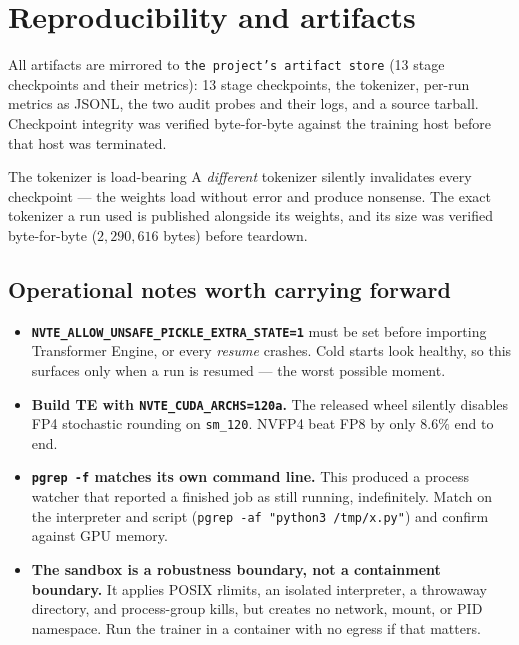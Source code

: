 \documentclass[10pt,a4paper]{article}
\newcommand{\code}[1]{\texttt{\small #1}}
\begin{document}
\section{Reproducibility and artifacts}

All artifacts are mirrored to \code{the project's artifact store}
(13 stage checkpoints and their metrics): 13 stage checkpoints, the tokenizer, per-run metrics as
JSONL, the two audit probes and their logs, and a source tarball. Checkpoint
integrity was verified byte-for-byte against the training host before that host
was terminated.

\begin{finding}{The tokenizer is load-bearing}
A \emph{different} tokenizer silently invalidates every checkpoint --- the
weights load without error and produce nonsense. The exact tokenizer a run used
is published alongside its weights, and its size was verified byte-for-byte
($2{,}290{,}616$ bytes) before teardown.
\end{finding}

\subsection{Operational notes worth carrying forward}

\begin{itemize}
\item \textbf{\code{NVTE\_ALLOW\_UNSAFE\_PICKLE\_EXTRA\_STATE=1}} must be set
before importing Transformer Engine, or every \emph{resume} crashes. Cold starts
look healthy, so this surfaces only when a run is resumed --- the worst possible
moment.
\item \textbf{Build TE with \code{NVTE\_CUDA\_ARCHS=120a}.} The released wheel
silently disables FP4 stochastic rounding on \code{sm\_120}. NVFP4 beat FP8 by
only $8.6\%$ end to end.
\item \textbf{\code{pgrep -f} matches its own command line.} This produced a
process watcher that reported a finished job as still running, indefinitely.
Match on the interpreter and script (\code{pgrep -af "python3 /tmp/x.py"}) and
confirm against GPU memory.
\item \textbf{The sandbox is a robustness boundary, not a containment
boundary.} It applies POSIX rlimits, an isolated interpreter, a throwaway
directory, and process-group kills, but creates no network, mount, or PID
namespace. Run the trainer in a container with no egress if that matters.
\end{itemize}
\end{document}
